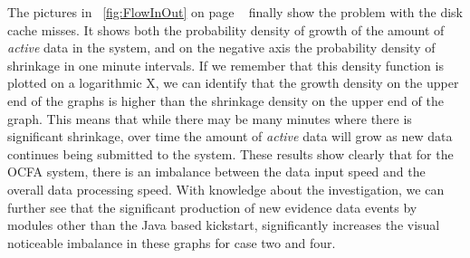 The pictures in ~\ref{fig:FlowInOut} on page ~\pageref{fig:FlowInOut} finally show the problem with the disk cache misses. It shows both the probability density of growth of the amount of \emph{active} data in the system, and on the negative axis the probability density of shrinkage in one minute intervals. If we remember that this density function is plotted on a logarithmic X, we can identify that the growth density on the upper end of the graphs is higher than the shrinkage density on the upper end of the graph. This means that while there may be many minutes where there is significant shrinkage, over time the amount of \emph{active} data will grow as new data continues being submitted to the system. These results show clearly that for the OCFA system, there is an imbalance between the data input speed and the overall data processing speed. With knowledge about the investigation, we can further see that the significant production of new evidence data events by modules other than the Java based kickstart, significantly increases the visual noticeable imbalance in these graphs for case two and four.  
